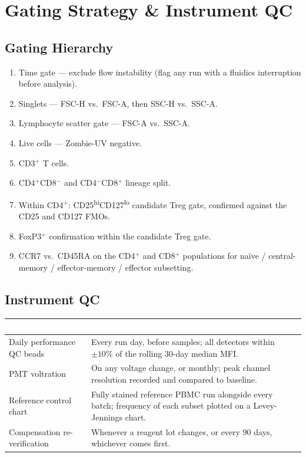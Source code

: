 \section{Gating Strategy \& Instrument QC}
\label{sec:gating}

\subsection{Gating Hierarchy}
\begin{enumerate}
\item Time gate --- exclude flow instability (flag any run with a
  fluidics interruption before analysis).
\item Singlets --- FSC-H vs.\ FSC-A, then SSC-H vs.\ SSC-A.
\item Lymphocyte scatter gate --- FSC-A vs.\ SSC-A.
\item Live cells --- Zombie-UV negative.
\item CD3\(^{+}\) T cells.
\item CD4\(^{+}\)CD8\(^{-}\) and CD4\(^{-}\)CD8\(^{+}\) lineage split.
\item Within CD4\(^{+}\): CD25\textsuperscript{hi}CD127\textsuperscript{lo}
  candidate Treg gate, confirmed against the CD25 and CD127 FMOs.
\item FoxP3\(^{+}\) confirmation within the candidate Treg gate.
\item CCR7 vs.\ CD45RA on the CD4\(^{+}\) and CD8\(^{+}\) populations for
  na\"ive / central-memory / effector-memory / effector subsetting.
\end{enumerate}

\subsection{Instrument QC}
\begin{center}
\renewcommand{\arraystretch}{1.2}
\begin{tabularx}{\linewidth}{@{}L{3.3cm}X@{}}
\toprule
{}
\textcolor{white}{\textbf{Check}} & \textcolor{white}{\textbf{Frequency \& acceptance}} \\
\midrule
Daily performance QC beads & Every run day, before samples; all detectors within \(\pm 10\%\) of the rolling 30-day median MFI. \\
PMT voltration & On any voltage change, or monthly; peak channel resolution recorded and compared to baseline. \\
Reference control chart & Fully stained reference PBMC run alongside every batch; frequency of each subset plotted on a Levey-Jennings chart. \\
Compensation re-verification & Whenever a reagent lot changes, or every 90 days, whichever comes first. \\
\bottomrule
\end{tabularx}
\end{center}

